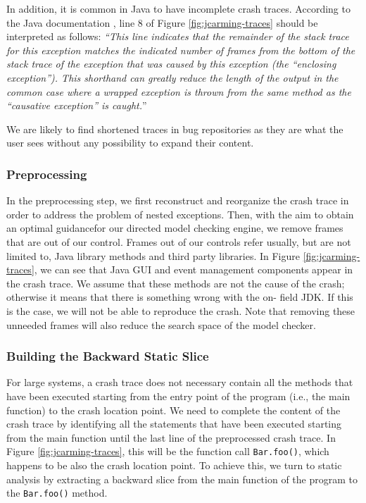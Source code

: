 In addition, it is common in Java to have incomplete crash
traces. According to the Java documentation \cite{Oracle2011}, line 8 of
Figure \ref{fig:jcarming-traces} should be interpreted as follows: {\it ``This line indicates
that the remainder of the stack trace for this exception
matches the indicated number of frames from the bottom of the
stack trace of the exception that was caused by this exception
(the ``enclosing exception''). This shorthand can greatly
reduce the length of the output in the common case where a
wrapped exception is thrown from the same method as the
``causative exception'' is caught.}''

We are likely to find shortened traces in bug repositories as
they are what the user sees without any possibility to expand
their content.

\subsubsection{Preprocessing}

In the preprocessing step, we first reconstruct and reorganize
the crash trace in order to address the problem of nested
exceptions. Then, with the aim to obtain an optimal guidancefor our directed model checking engine, we remove frames
that are out of our control. Frames out of our controls refer
usually, but are not limited to, Java library methods and third
party libraries. In Figure \ref{fig:jcarming-traces}, we can see that Java GUI and
event management components appear in the crash trace. We
assume that these methods are not the cause of the crash;
otherwise it means that there is something wrong with the on-
field JDK. If this is the case, we will not be able to reproduce
the crash. Note that removing these unneeded frames will also
reduce the search space of the model checker.

\subsubsection{Building the Backward Static Slice}

For large systems, a crash trace does not necessary contain all
the methods that have been executed starting from the entry
point of the program (i.e., the main function) to the crash
location point. We need to complete the content of the crash
trace by identifying all the statements that have been executed
starting from the main function until the last line of the
preprocessed crash trace. In Figure \ref{fig:jcarming-traces}, this will be the function
call {\tt Bar.foo()}, which happens to be also the crash location
point. To achieve this, we turn to static analysis by extracting
a backward slice from the main function of the program to the
{\tt Bar.foo()} method.

